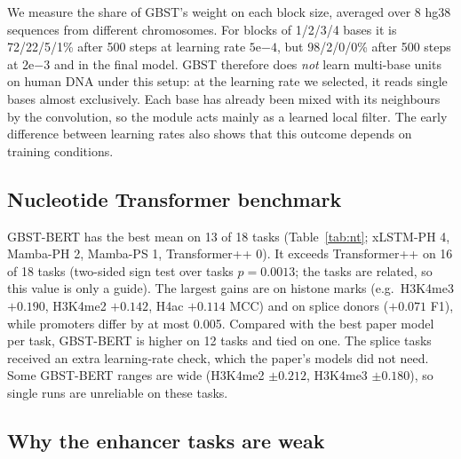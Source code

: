 \documentclass{article}
\begin{document}
We measure the share of GBST's weight on each block size, averaged over 8 hg38 sequences from
different chromosomes. For blocks of 1/2/3/4 bases it is 72/22/5/1\% after 500 steps at learning rate
$5\mathrm{e}{-4}$, but 98/2/0/0\% after 500 steps at $2\mathrm{e}{-3}$ and in the final model. GBST
therefore does \emph{not} learn multi-base units on human DNA under this setup: at the learning rate
we selected, it reads single bases almost exclusively. Each base has already been mixed with its
neighbours by the convolution, so the module acts mainly as a learned local filter. The early
difference between learning rates also shows that this outcome depends on training conditions.

\subsection{Nucleotide Transformer benchmark}

\begin{table}[t]
  \caption{NT benchmark test scores, mean $\pm$ range over 10 seeds. The first five columns are
  Bio-xLSTM Table 1; the last two are ours. Bold: best mean (ties counted for each model).}
  \label{tab:nt}
  \centering
  \scriptsize
  \setlength{\tabcolsep}{2.5pt}
  \resizebox{\linewidth}{!}{}
\end{table}

GBST-BERT has the best mean on 13 of 18 tasks (Table~\ref{tab:nt}; xLSTM-PH 4, Mamba-PH 2, Mamba-PS 1,
Transformer++ 0). It exceeds Transformer++ on 16 of 18 tasks (two-sided sign test over tasks
$p=0.0013$; the tasks are related, so this value is only a guide). The largest gains are on histone
marks (e.g.\ H3K4me3 $+0.190$, H3K4me2 $+0.142$, H4ac $+0.114$ MCC) and on splice donors ($+0.071$
F1), while promoters differ by at most 0.005. Compared with the best paper model per task, GBST-BERT
is higher on 12 tasks and tied on one. The splice tasks received an extra learning-rate check, which the
paper's models did not need. Some GBST-BERT
ranges are wide (H3K4me2 $\pm0.212$, H3K4me3 $\pm0.180$), so single runs are unreliable on these tasks.

\subsection{Why the enhancer tasks are weak}\label{sec:enh}

\begin{table}[t]
  \caption{Validation and test scores (MCC). Our models: mean over 10 seeds. 4-mer baseline: logistic
  regression on 4-mer frequencies, one 90/10 split. Last column: test sequences with an exact copy in
  the training file. Copies always carry the same label.}
  \label{tab:enh}
  \centering
  \small
  \setlength{\tabcolsep}{4pt}
  \resizebox{\linewidth}{!}{}
\end{table}
\end{document}
